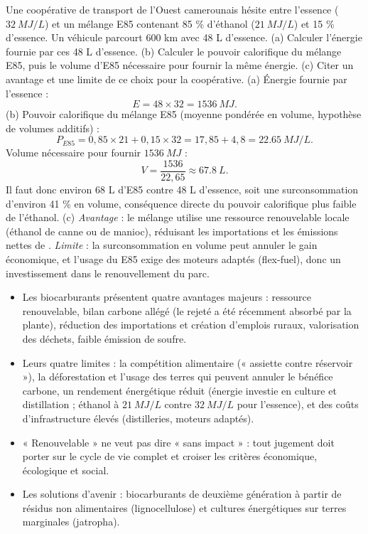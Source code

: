 \documentclass[11pt]{article}
\newcommand{\cle}[1]{{\popxbold\color{popdark}#1}}
\begin{document}
\begin{exoresolu}
Une coopérative de transport de l'Ouest camerounais hésite entre l'essence ($\SI{32}{MJ/L}$) et un mélange E85 contenant 85 \% d'éthanol ($\SI{21}{MJ/L}$) et 15 \% d'essence. Un véhicule parcourt 600 km avec 48 L d'essence. (a) Calculer l'énergie fournie par ces 48 L d'essence. (b) Calculer le pouvoir calorifique du mélange E85, puis le volume d'E85 nécessaire pour fournir la même énergie. (c) Citer un avantage et une limite de ce choix pour la coopérative.
\tcblower
(a) Énergie fournie par l'essence :
\[ E = 48 \times 32 = \SI{1536}{MJ}. \]
(b) Pouvoir calorifique du mélange E85 (moyenne pondérée en volume, hypothèse de volumes additifs) :
\[ P_{E85} = 0{,}85 \times 21 + 0{,}15 \times 32 = 17{,}85 + 4{,}8 = \SI{22,65}{MJ/L}. \]
Volume nécessaire pour fournir $\SI{1536}{MJ}$ :
\[ V = \frac{1536}{22{,}65} \approx \SI{67,8}{L}. \]
Il faut donc environ 68 L d'E85 contre 48 L d'essence, soit une surconsommation d'environ 41 \% en volume, conséquence directe du pouvoir calorifique plus faible de l'éthanol.
(c) \emph{Avantage} : le mélange utilise une ressource renouvelable locale (éthanol de canne ou de manioc), réduisant les importations et les émissions nettes de . \emph{Limite} : la surconsommation en volume peut annuler le gain économique, et l'usage du E85 exige des moteurs adaptés (flex-fuel), donc un investissement dans le renouvellement du parc.
\end{exoresolu}

\begin{aretenir}
\begin{itemize}
\item Les biocarburants présentent quatre avantages majeurs : ressource \cle{renouvelable}, bilan carbone allégé (le  rejeté a été récemment absorbé par la plante), réduction des importations et création d'emplois ruraux, valorisation des déchets, faible émission de soufre.
\item Leurs quatre limites : la \cle{compétition alimentaire} (« assiette contre réservoir »), la déforestation et l'usage des terres qui peuvent annuler le bénéfice carbone, un rendement énergétique réduit (énergie investie en culture et distillation ; éthanol à $\SI{21}{MJ/L}$ contre $\SI{32}{MJ/L}$ pour l'essence), et des coûts d'infrastructure élevés (distilleries, moteurs adaptés).
\item « Renouvelable » ne veut pas dire « sans impact » : tout jugement doit porter sur le \cle{cycle de vie} complet et croiser les critères économique, écologique et social.
\item Les solutions d'avenir : biocarburants de \cle{deuxième génération} à partir de résidus non alimentaires (lignocellulose) et cultures énergétiques sur terres marginales (jatropha).
\end{itemize}
\end{aretenir}
\end{document}

